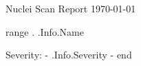 \documentclass{article}
\begin{document}

\begin{titlepage}
\begin{center}
{\huge Nuclei Scan Report}
\vfill
\large{\today}

\end{center}
\end{titlepage}


{{range .}}
	{{.Info.Name}}

	Severity: \colorbox{ {{- .Info.Severity -}} }{ {{- .Info.Severity -}} }
{{end}}

\end{document}
